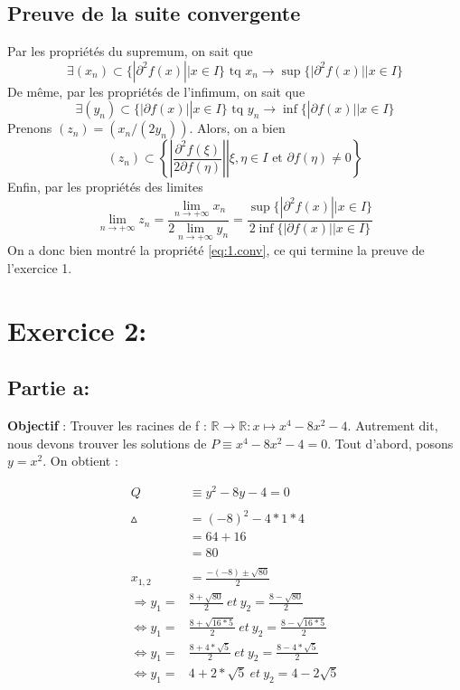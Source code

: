 \documentclass[a4paper, 12pt]{article}
\begin{document}
\subsection{Preuve de la suite convergente}

Par les propriétés du supremum, on sait que
$$
\exists (x_n) \subset \{ | \partial^2 f(x) || x \in I \} \text{ tq } x_n \to \sup \{ | \partial^2 f(x) || x \in I \}
$$
De même, par les propriétés de l'infimum, on sait que
$$
\exists (y_n) \subset \{ |\partial f(x)|| x \in I \} \text { tq } y_n \to \inf \{ |\partial f(x)|| x \in I \}
$$
Prenons \( (z_n) = (x_n/(2y_n)) \). Alors, on a bien
$$
(z_n) \subset
\left\{ \left. \left| \frac{\partial^2f(\xi)}{2\partial f(\eta)} \right| \right| \xi, \eta \in I \text{ et } \partial f(\eta) \neq 0 \right\}
$$
Enfin, par les propriétés des limites
$$
\lim_{n \to +\infty} z_n
= \frac{\lim_{n \to +\infty} x_n}{2 \lim_{n \to +\infty} y_n}
= \frac{\sup \{ | \partial^2 f(x) || x \in I \}}{2 \inf \{ |\partial f(x)|| x \in I \}}
$$
On a donc bien montré la propriété \eqref{eq:1.conv}, ce qui termine la preuve de l'exercice 1.

\newpage
\section{Exercice 2:}
\subsection{Partie a:}

\textbf{Objectif} : Trouver les racines de f : \( \mathbb{R} \rightarrow \mathbb{R} : x \mapsto x^4 - 8x^2 - 4 \).
Autrement dit, nous devons trouver les solutions de \( P \equiv x^4 - 8x^2 - 4 = 0 \). \newline
Tout d'abord, posons \( y = x^2 \).
On obtient : 

\begin{align*}
	Q &\equiv y^2 - 8y - 4 = 0\\ \\
	\vartriangle &= (-8)^2 - 4 * 1 * 4 \\
	       &= 64 + 16 \\
	       &= 80 \\ \\
   x_{1,2} &= \frac{-(-8) \pm \sqrt{80}}{2} \\
   \Rightarrow y_1 = &\frac{8 + \sqrt{80}}{2} ~ et ~ y_2 = \frac{8 - \sqrt{80}}{2} \\
   \Leftrightarrow y_1 = &\frac{8 + \sqrt{16 * 5}}{2} ~ et ~ y_2 = \frac{8 - \sqrt{16 * 5}}{2} \\
   \Leftrightarrow y_1 = &\frac{8 + 4 * \sqrt{5}}{2} ~ et ~ y_2 = \frac{8 - 4 * \sqrt{5}}{2} \\
    \Leftrightarrow y_1 = &4 + 2 * \sqrt{5} ~ et ~ y_2 = 4 - 2\sqrt{5}
\end{align*}
\end{document}
